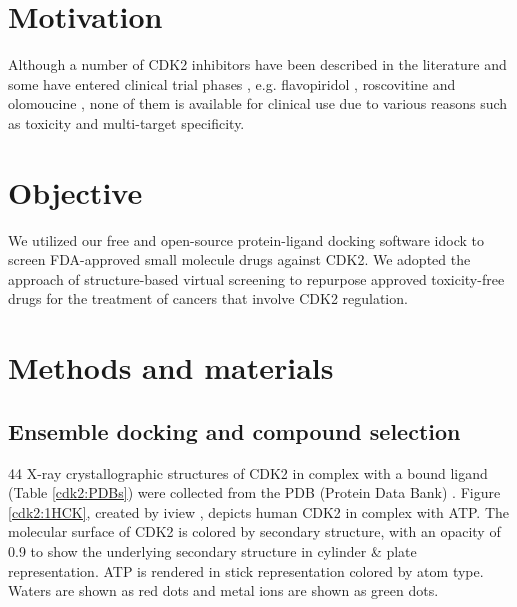 \section{Motivation}

Although a number of CDK2 inhibitors have been described in the literature and some have entered clinical trial phases \citep{1603}, e.g. flavopiridol \citep{1596}, roscovitine \citep{1597} and olomoucine \citep{1598}, none of them is available for clinical use due to various reasons such as toxicity and multi-target specificity.

\section{Objective}

We utilized our free and open-source protein-ligand docking software idock \citep{1153,1362} to screen FDA-approved small molecule drugs against CDK2. We adopted the approach of structure-based virtual screening to repurpose approved toxicity-free drugs for the treatment of cancers that involve CDK2 regulation.

\section{Methods and materials}

\subsection{Ensemble docking and compound selection}

44 X-ray crystallographic structures of CDK2 in complex with a bound ligand (Table \ref{cdk2:PDBs}) were collected from the PDB (Protein Data Bank) \citep{540,537}. Figure \ref{cdk2:1HCK}, created by iview \cite{1366}, depicts human CDK2 in complex with ATP. The molecular surface of CDK2 is colored by secondary structure, with an opacity of 0.9 to show the underlying secondary structure in cylinder \& plate representation. ATP is rendered in stick representation colored by atom type. Waters are shown as red dots and metal ions are shown as green dots.

